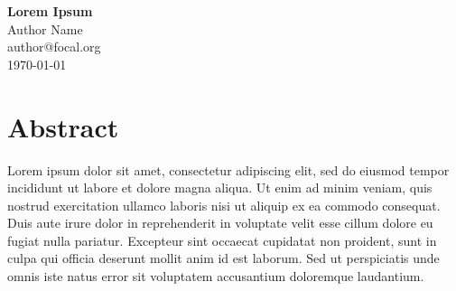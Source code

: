 \documentclass[a4paper,11pt]{article}
\begin{document}
\begin{center}
{\huge \textbf{Lorem Ipsum}} \\[2em]
{\large {}\selectfont Author Name} \\[.2em]
{\large {author@focal.org}} \\[1em]
{\large \today}
\end{center}

\section*{Abstract}

\vspace{1em}
\begin{mdframed}[
  linewidth=190000sp,
  linecolor=black,
  topline=false,
  bottomline=false,
  rightline=false,
  innerleftmargin=14pt,
  innerrightmargin=1pt,
  innertopmargin=0pt,
  innerbottommargin=-0.5pt]
  {\small{}\selectfont Lorem ipsum dolor sit amet, consectetur adipiscing elit, sed do eiusmod tempor incididunt ut labore et dolore magna aliqua. Ut enim ad minim veniam, quis nostrud exercitation ullamco laboris nisi ut aliquip ex ea commodo consequat. Duis aute irure dolor in reprehenderit in voluptate velit esse cillum dolore eu fugiat nulla pariatur. Excepteur sint occaecat cupidatat non proident, sunt in culpa qui officia deserunt mollit anim id est laborum. Sed ut perspiciatis unde omnis iste natus error sit voluptatem accusantium doloremque laudantium.}
\end{mdframed}
\end{document}
